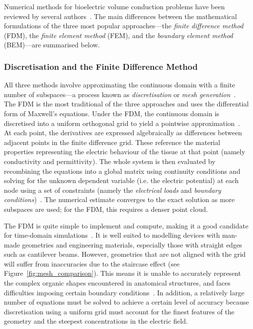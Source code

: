Numerical methods for bioelectric volume conduction problems have been reviewed
by several
authors~\cite{cendes1989,miller1990,schimpf1998,bondeson2005,johnson2006}. The
main differences between the mathematical formulations of the three most popular
approaches---the \emph{finite difference method} (FDM), the
\emph{finite element method} (FEM), and the \emph{boundary element method}
(BEM)---are summarised below.

\subsubsection{Discretisation and the Finite Difference Method}

All three methods involve approximating the continuous domain with a finite
number of subspaces---a process known as \emph{discretisation} or \emph{mesh
generation}~\cite{reddy1993}. The FDM is the most traditional of the three
approaches and uses the differential form of Maxwell's equations. Under the FDM,
the continuous domain is discretised into a uniform orthogonal grid to yield a
pointwise approximation~\cite{schimpf1998}. At each point, the derivatives are
expressed algebraically as differences between adjacent points in the finite
difference grid. These reference the material properties representing the
electric behaviour of the tissue at that point (namely conductivity and
permittivity). The whole system is then evaluated by recombining the equations
into a global matrix using continuity conditions and solving for the unknown
dependent variable (i.e. the electric potential) at each node using a set of
constraints (namely the \emph{electrical loads} and \emph{boundary
conditions})~\cite{bondeson2005}. The numerical estimate converges to the exact
solution as more subspaces are used; for the FDM, this requires a denser point
cloud.

The FDM is quite simple to implement and compute, making it a good candidate for
time-domain simulations~\cite{bondeson2005}. It is well suited to modelling
devices with man-made geometries and engineering materials, especially those
with straight edges such as cantilever beams. However, geometries that are not
aligned with the grid will suffer from inaccuracies due to the staircase effect
(see Figure~\ref{fig:mesh_comparison}). This means it is unable to accurately
represent the complex organic shapes encountered in anatomical structures, and
faces difficulties imposing certain boundary conditions~\cite{johnson2006}. In
addition, a relatively large number of equations must be solved to achieve a
certain level of accuracy because discretisation using a uniform grid must
account for the finest features of the geometry and the steepest concentrations
in the electric field.

